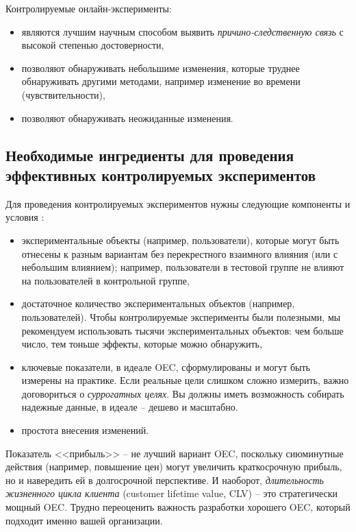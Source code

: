 \documentclass[%
	11pt,
	a4paper,
	utf8,
		]{article}
\begin{document}
Контролируемые онлайн-эксперименты:
\begin{itemize}
	\item являются лучшим научным способом выявить \emph{причино-следственную связь} с высокой степенью достоверности,
	
	\item позволяют обнаруживать небольшиме изменения, которые труднее обнаруживать другими методами, например изменение во времени (чувствительности),
	
	\item позволяют обнаруживать неожиданные изменения.
\end{itemize}

\subsection{Необходимые ингредиенты для проведения эффективных контролируемых экспериментов}

Для проведения контролируемых экспериментов нужны следующие компоненты и условия \cite[]{gruzdev:time-series-2022}:
\begin{itemize}
	\item экспериментальные объекты (например, пользователи), которые могут быть отнесены к разным вариантам без перекрестного взаимного влияния (или с небольшим влиянием); например, пользователи в тестовой группе не влияют на пользователей в контрольной группе,
	
	\item достаточное количество экспериментальных объектов (например, пользователей). Чтобы контролируемые эксперименты были полезными, мы рекомендуем использовать тысячи экспериментальных объектов: чем больше число, тем тоньше эффекты, которые можно обнаружить,
	
	\item ключевые показатели, в идеале OEC, сформулированы и могут быть измерены на практике. Если реальные цели слишком сложно измерить, важно договориться о \emph{суррогатных целях}. Вы должны иметь возможность собирать надежные данные, в идеале -- дешево и масштабно.
	
	\item простота внесения изменений.
\end{itemize}

Показатель <<прибыль>> -- не лучший вариант OEC, поскольку сиюминутные действия (например, повышение цен) могут увеличить краткосрочную прибыль, но и навередить ей в долгосрочной перспективе. И наоборот, \emph{длительность жизненного цикла клиента} (customer lifetime value, CLV) -- это стратегически мощный OEC. Трудно переоценить важность разработки хорошего OEC, который подходит именно вашей организации.
\end{document}
